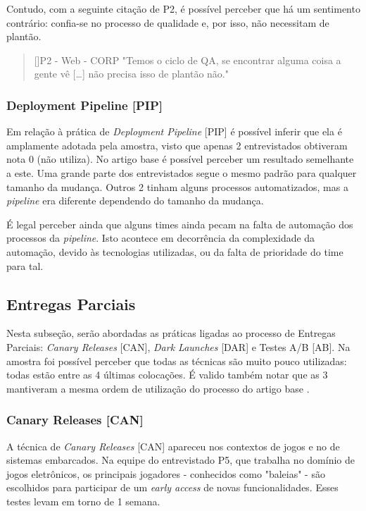 Contudo, com a seguinte citação de P2, é possível perceber que há um sentimento contrário: confia-se no processo de qualidade e, por isso, não necessitam de plantão.

\begin{quotation}[]{P2 - Web - CORP}
    "Temos o ciclo de QA, se encontrar alguma coisa a gente vê […] não precisa isso de plantão não." 
\end{quotation}

\subsubsection{Deployment Pipeline [PIP]}

Em relação à prática de \emph{Deployment Pipeline} [PIP] é possível inferir que ela é amplamente adotada pela amostra, visto que apenas 2 entrevistados obtiveram nota 0 (não utiliza). No artigo base \cite{empiricalStudy2016} é possível perceber um resultado semelhante a este. Uma grande parte dos entrevistados segue o mesmo padrão para qualquer tamanho da mudança. Outros 2 tinham alguns processos automatizados, mas a \emph{pipeline} era diferente dependendo do tamanho da mudança.

É legal perceber ainda que alguns times ainda pecam na falta de automação dos processos da \emph{pipeline}. Isto acontece em decorrência da complexidade da automação, devido às tecnologias utilizadas, ou da falta de prioridade do time para tal.
 
\subsection{Entregas Parciais}

Nesta subseção, serão abordadas as práticas ligadas ao processo de Entregas Parciais: \emph{Canary Releases} [CAN], \emph{Dark Launches} [DAR] e Testes A/B [AB]. Na amostra foi possível perceber que todas as técnicas são muito pouco utilizadas: todas estão entre as 4 últimas colocações. É valido também notar que as 3 mantiveram a mesma ordem de utilização do processo do artigo base \cite{empiricalStudy2016}.

\subsubsection{Canary Releases [CAN]}

A técnica de \emph{Canary Releases} [CAN] apareceu nos contextos de jogos e no de sistemas embarcados. Na equipe do entrevistado P5, que trabalha no domínio de jogos eletrônicos, os principais jogadores - conhecidos como "baleias" - são escolhidos para participar de um \emph{early access} de novas funcionalidades.  Esses testes levam em torno de 1 semana. 

